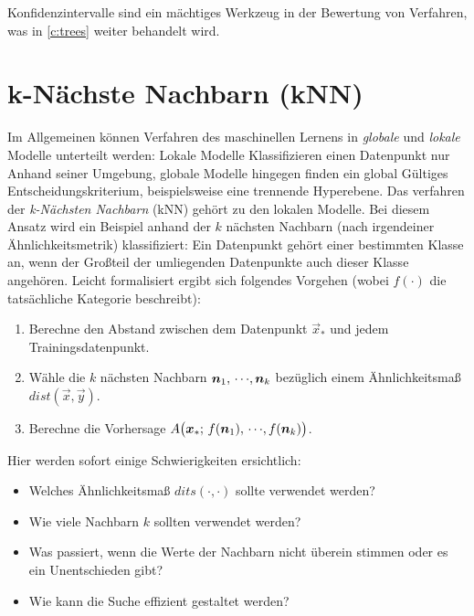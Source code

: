 			Konfidenzintervalle sind ein mächtiges Werkzeug in der Bewertung von Verfahren, was in \autoref{c:trees} weiter behandelt wird.

\chapter{k-Nächste Nachbarn (kNN)}
	Im Allgemeinen können Verfahren des maschinellen Lernens in \emph{globale} und \emph{lokale} Modelle unterteilt werden: Lokale Modelle Klassifizieren einen Datenpunkt nur Anhand seiner Umgebung, globale Modelle hingegen finden ein global Gültiges Entscheidungskriterium, beispielsweise eine trennende Hyperebene. Das verfahren der \emph{k-Nächsten Nachbarn} (kNN) gehört zu den lokalen Modelle. Bei diesem Ansatz wird ein Beispiel anhand der \(k\) nächsten Nachbarn (nach irgendeiner Ähnlichkeitsmetrik) klassifiziert: Ein Datenpunkt gehört einer bestimmten Klasse an, wenn der Großteil der umliegenden Datenpunkte auch dieser Klasse angehören. Leicht formalisiert ergibt sich folgendes Vorgehen (wobei \( f(\cdot) \) die tatsächliche Kategorie beschreibt):
	\begin{enumerate}
		\item Berechne den Abstand zwischen dem Datenpunkt \( \vec{x}_\ast \) und jedem Trainingsdatenpunkt.
		\item Wähle die \(k\) nächsten Nachbarn \( \bm{n}_1,\,\cdots\!,\bm{n}_k \) bezüglich einem Ähnlichkeitsmaß \( \mathit{dist}(\vec{x}, \vec{y}) \).
		\item Berechne die Vorhersage \( A\big( \bm{x}_\ast;\, f(\bm{n}_1),\,\cdots\!,f(\bm{n}_k) \big) \).
	\end{enumerate}
	Hier werden sofort einige Schwierigkeiten ersichtlich:
	\begin{itemize}
		\item Welches Ähnlichkeitsmaß \( \mathit{dits}(\cdot, \cdot) \) sollte verwendet werden?
		\item Wie viele Nachbarn \(k\) sollten verwendet werden?
		\item Was passiert, wenn die Werte der Nachbarn nicht überein stimmen oder es ein Unentschieden gibt?
		\item Wie kann die Suche effizient gestaltet werden?
	\end{itemize}

